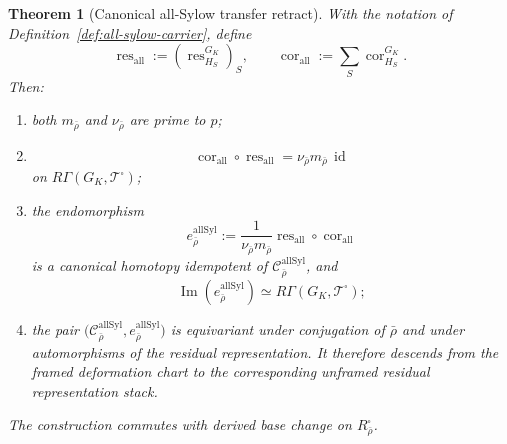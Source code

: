 \documentclass[11pt]{article}
\newtheorem{theorem}{Theorem}[section]
\theoremstyle{definition}
\begin{document}
\begin{theorem}[Canonical all-Sylow transfer retract]\label{thm:all-sylow-transfer}
With the notation of Definition~\ref{def:all-sylow-carrier}, define
\[
 \operatorname{res}_{\mathrm{all}}
 :=
 (\operatorname{res}_{H_S}^{G_K})_S,
 \qquad
 \operatorname{cor}_{\mathrm{all}}
 :=
 \sum_S\operatorname{cor}_{H_S}^{G_K}.
\]
Then:
\begin{enumerate}[label=\textnormal{(\roman*)}]
\item both $m_{\bar\rho}$ and $\nu_{\bar\rho}$ are prime to $p$;
\item
\begin{equation}\label{eq:all-sylow-cor-res}
 \operatorname{cor}_{\mathrm{all}}
 \circ
 \operatorname{res}_{\mathrm{all}}
 =
 \nu_{\bar\rho}m_{\bar\rho}\,\operatorname{id}
\end{equation}
on $R\Gamma(G_K,\mathcal T^{\square})$;
\item the endomorphism
\begin{equation}\label{eq:all-sylow-idempotent}
 e_{\bar\rho}^{\mathrm{allSyl}}
 :=
 \frac1{\nu_{\bar\rho}m_{\bar\rho}}
 \operatorname{res}_{\mathrm{all}}
 \circ
 \operatorname{cor}_{\mathrm{all}}
\end{equation}
is a canonical homotopy idempotent of
$\mathcal C_{\bar\rho}^{\mathrm{allSyl}}$, and
\[
 \operatorname{Im}(e_{\bar\rho}^{\mathrm{allSyl}})
 \simeq
 R\Gamma(G_K,\mathcal T^{\square});
\]
\item the pair
$\bigl(\mathcal C_{\bar\rho}^{\mathrm{allSyl}},
 e_{\bar\rho}^{\mathrm{allSyl}}\bigr)$
is equivariant under conjugation of $\bar\rho$ and under automorphisms of the residual representation.  It therefore descends from the framed deformation chart to the corresponding unframed residual representation stack.
\end{enumerate}
The construction commutes with derived base change on $R_{\bar\rho}^{\square}$.
\end{theorem}
\end{document}
